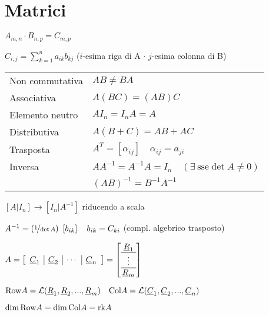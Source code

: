 \section{Matrici}
$A_{m,n} \cdot B_{n,p} = C_{m,p}$

$C_{i,j} = \sum_{k=1}^{n} a_{ik} b_{kj}$ ($i$-esima riga di A $\cdot$ $j$-esima colonna di B)

\begin{tabular}{ll}
	Non commutativa & $A B \ne B A$ \\
	Associativa & $A(BC) = (AB)C$ \\
	Elemento neutro & $AI_n = I_nA = A$ \\
	Distributiva & $A(B+C) = AB + AC$ \\
	Trasposta & $A^T = [\alpha_{ij}] \quad \alpha_{ij} = a_{ji}$ \\
	Inversa & $AA^{-1} = A^{-1}A = I_n\quad (\exists\ \text{sse} \det A \ne 0)$ \\
	& $(AB)^{-1} = B^{-1}A^{-1}$ \\
\end{tabular}

$[A|I_n] \rightarrow [I_n|A^{-1}]$ riducendo a scala

$A^{-1} = (\nicefrac{1}{\det{A}})\ \left[b_{ik}\right] \quad b_{ik} = C_{ki}$ (compl. algebrico trasposto)

$A =
\left[\begin{array}{c|c|c|c} \vec{C}_1 & \vec{C}_2 & \cdots & \vec{C}_n \end{array}\right]
=
\left[\arraycolsep=1.7pt\def\arraystretch{1}\begin{array}{c} \vec{R}_1 \\ \hline \vdots \\ \hline \vec{R}_m \end{array}\right]$

$\mathrm{Row} A = \mathcal{L}(\underline{R}_1, \underline{R}_2, ..., \underline{R}_m) \quad \mathrm{Col} A = \mathcal{L}(\underline{C}_1, \underline{C}_2, ..., \underline{C}_n)$

$\dim \mathrm{Row} A = \dim \mathrm{Col} A = \mathrm{rk} A$